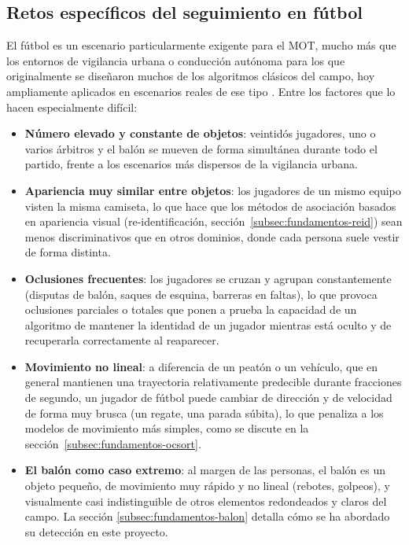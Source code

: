 \subsection{Retos específicos del seguimiento en fútbol}

El fútbol es un escenario particularmente exigente para el MOT, mucho más
que los entornos de vigilancia urbana o conducción autónoma para los que
originalmente se diseñaron muchos de los algoritmos clásicos del campo,
hoy ampliamente aplicados en escenarios reales de ese tipo
\citep{ultralytics2026track}. Entre los factores que lo hacen especialmente
difícil:

\begin{itemize}
  \item \textbf{Número elevado y constante de objetos}: veintidós
        jugadores, uno o varios árbitros y el balón se mueven de forma
        simultánea durante todo el partido, frente a los escenarios más
        dispersos de la vigilancia urbana.
  \item \textbf{Apariencia muy similar entre objetos}: los jugadores de un
        mismo equipo visten la misma camiseta, lo que hace que los métodos
        de asociación basados en apariencia visual (re-identificación,
        sección~\ref{subsec:fundamentos-reid}) sean menos discriminativos
        que en otros dominios, donde cada persona suele vestir de forma
        distinta.
  \item \textbf{Oclusiones frecuentes}: los jugadores se cruzan y agrupan
        constantemente (disputas de balón, saques de esquina, barreras en
        faltas), lo que provoca oclusiones parciales o totales que ponen a
        prueba la capacidad de un algoritmo de mantener la identidad de un
        jugador mientras está oculto y de recuperarla correctamente al
        reaparecer.
  \item \textbf{Movimiento no lineal}: a diferencia de un peatón o un
        vehículo, que en general mantienen una trayectoria relativamente
        predecible durante fracciones de segundo, un jugador de fútbol
        puede cambiar de dirección y de velocidad de forma muy brusca (un
        regate, una parada súbita), lo que penaliza a los modelos de
        movimiento más simples, como se discute en la
        sección~\ref{subsec:fundamentos-ocsort}.
  \item \textbf{El balón como caso extremo}: al margen de las personas, el
        balón es un objeto pequeño, de movimiento muy rápido y no lineal
        (rebotes, golpeos), y visualmente casi indistinguible de otros
        elementos redondeados y claros del campo. La sección
        \ref{subsec:fundamentos-balon} detalla cómo se ha abordado su detección en este proyecto.
\end{itemize}

